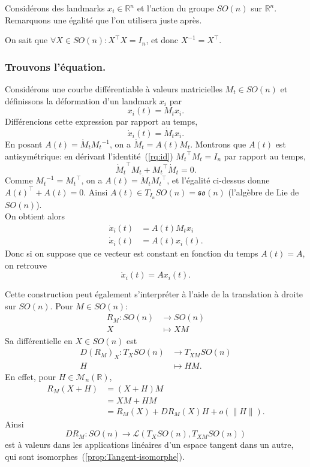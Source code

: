 \documentclass[12pt]{report}
\begin{document}
Considérons des landmarks $x_i\in\mathbb{R}^n$ et l'action du groupe $SO(n)$ sur $\mathbb{R}^n$. Remarquons une égalité que l'on utilisera juste après.
\begin{remark}\label{rq:id}
On sait que $\forall X\in SO(n)\colon X^{\top}X=I_n$, et donc $X^{-1}=X^{\top}$.
\end{remark}

\subsubsection{Trouvons l'équation.}
Considérons une courbe différentiable à valeurs matricielles $M_t \in SO(n)$ et définissons la déformation d'un landmark $x_i$ par
\[
x_i(t)=M_{t}x_i.
\]
Différencions cette expression par rapport au temps,
\[
\dot{x}_i(t)=\dot{M}_{t}x_i.
\]
En posant $A(t) = \dot{M}_t{M_t}^{-1}$, on a $\dot{M}_t=A(t)M_t$. Montrons que $A(t)$ est antisymétrique: en dérivant l'identité~(\ref{rq:id}) ${M_t}^{\top}M_t=I_n$ par rapport au temps,
\[
{\dot{M}_t}^{\top}M_t+{M_t}^{\top}\dot{M}_t=0.
\]
Comme ${M_t}^{-1}={M_t}^{\top}$, on a $A(t)=\dot{M}_t{M_t}^{\top}$, et l'égalité ci-dessus donne $A{(t)}^{\top}+A(t)=0$. Ainsi $A(t) \in T_{I_n}SO(n) = \mathfrak{so}(n)$ (l'algèbre de Lie de $SO(n)$).\\
On obtient alors
\[
\begin{aligned}
\dot{x}_i(t)&=A(t)M_{t}x_i\\
\dot{x}_i(t)&=A(t)x_i(t).
\end{aligned}
\]
Donc si on suppose que ce vecteur est constant en fonction du temps $A(t)=A$, on retrouve
\[
\dot{x}_i(t)=Ax_i(t).
\]

\begin{remark}
Cette construction peut également s'interpréter à l'aide de la translation à droite sur $SO(n)$. Pour $M\in SO(n)$:
\[
\begin{aligned}
R_M\colon SO(n) &\longrightarrow SO(n)\\
X&\longmapsto XM
\end{aligned}
\]
Sa différentielle en $X\in SO(n)$ est
\[
\begin{aligned}
{D(R_M)}_X\colon T_{X}SO(n) &\longrightarrow T_{XM}SO(n)\\
H&\longmapsto HM.
\end{aligned}
\]
En effet, pour $H\in \mathcal{M}_n(\mathbb{R})$,
\[
\begin{aligned}
R_M(X+H)&=(X+H)M\\
&=XM+HM\\
&=R_M(X)+DR_M(X)H+o(\|H\|).
\end{aligned}
\]
Ainsi
\[
DR_M\colon SO(n) \longrightarrow \mathcal{L}(T_{X}SO(n),T_{XM}SO(n))
\]
est à valeurs dans les applications linéaires d'un espace tangent dans un autre, qui sont isomorphes~(\ref{prop:Tangent-isomorphe}).
\end{remark}
\end{document}
